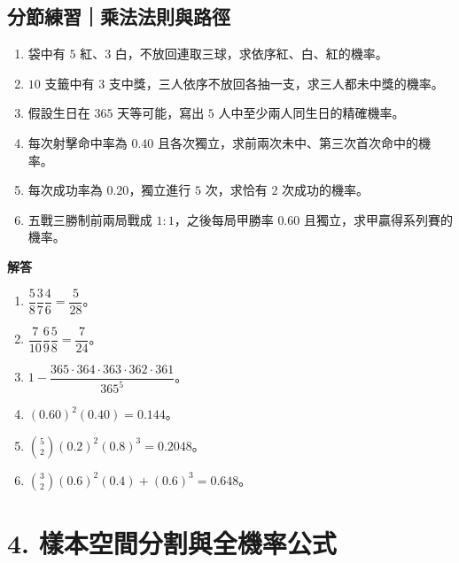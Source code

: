 \documentclass[11pt,a4paper]{article}
\providecommand{\tightlist}{%
  \setlength{\itemsep}{0pt}\setlength{\parskip}{0pt}}
\begin{document}
\begin{HandoutSelfCheck}

\subsection{分節練習｜乘法法則與路徑}\label{ux5206ux7bc0ux7df4ux7fd2ux4e58ux6cd5ux6cd5ux5247ux8207ux8defux5f91}

\begin{enumerate}
\def\labelenumi{\arabic{enumi}.}
\tightlist
\item
  袋中有 \(5\) 紅、\(3\) 白，不放回連取三球，求依序紅、白、紅的機率。
\item
  \(10\) 支籤中有 \(3\) 支中獎，三人依序不放回各抽一支，求三人都未中獎的機率。
\item
  假設生日在 \(365\) 天等可能，寫出 \(5\) 人中至少兩人同生日的精確機率。
\item
  每次射擊命中率為 \(0.40\) 且各次獨立，求前兩次未中、第三次首次命中的機率。
\item
  每次成功率為 \(0.20\)，獨立進行 \(5\) 次，求恰有 \(2\) 次成功的機率。
\item
  五戰三勝制前兩局戰成 \(1:1\)，之後每局甲勝率 \(0.60\) 且獨立，求甲贏得系列賽的機率。
\end{enumerate}

\textbf{解答}

\begin{enumerate}
\def\labelenumi{\arabic{enumi}.}
\tightlist
\item
  \(\dfrac58\dfrac37\dfrac46=\boxed{\dfrac5{28}}\)。
\item
  \(\dfrac7{10}\dfrac69\dfrac58=\boxed{\dfrac7{24}}\)。
\item
  \(\boxed{1-\dfrac{365\cdot364\cdot363\cdot362\cdot361}{365^5}}\)。
\item
  \((0.60)^2(0.40)=\boxed{0.144}\)。
\item
  \(\binom52(0.2)^2(0.8)^3=\boxed{0.2048}\)。
\item
  \(\binom32(0.6)^2(0.4)+(0.6)^3=\boxed{0.648}\)。
\end{enumerate}

\end{HandoutSelfCheck}

\section{4. 樣本空間分割與全機率公式}\label{ux6a23ux672cux7a7aux9593ux5206ux5272ux8207ux5168ux6a5fux7387ux516cux5f0f}
\end{document}
